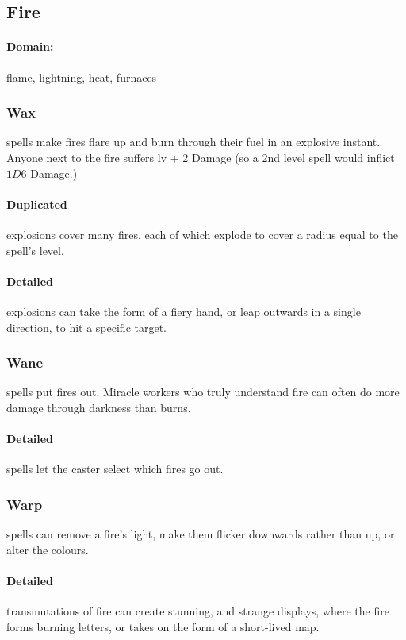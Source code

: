 \begin{multicols}{2}
\subsection{Fire}
\paragraph{Domain:}
flame, lightning, heat, furnaces

\subsubsection{Wax}
spells make fires flare up and burn through their fuel in an explosive instant.
Anyone next to the fire suffers \gls{lv} + 2 Damage (so a 2nd level spell would inflict $1D6$ Damage.)

\paragraph{Duplicated}
explosions cover many fires, each of which explode to cover a radius equal to the spell's level.

\paragraph{Detailed}
explosions can take the form of a fiery hand, or leap outwards in a single direction, to hit a specific target.

\subsubsection{Wane}
spells put fires out.
Miracle workers who truly understand fire can often do more damage through darkness than burns.

\paragraph{Detailed}
spells let the caster select which fires go out.

\subsubsection{Warp}
spells can remove a fire's light, make them flicker downwards rather than up, or alter the colours.

\paragraph{Detailed}
transmutations of fire can create stunning, and strange displays, where the fire forms burning letters, or takes on the form of a short-lived map.


\end{multicols}
